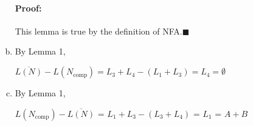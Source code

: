 \documentclass[11pt]{article}
\newcommand{\comp}[1]{#1_{\text{comp}}}
\begin{document}
\begin{solution}
\begin{enumerate}[(a)]
\paragraph{Proof:} This lemma is true by the definition of NFA.$\blacksquare$

\item
By Lemma 1,
\begin{center}
	$\overline{L(N)} - L(\comp{N}) = L_3 + L_4 - (L_1 + L_3) = L_4 = \emptyset$
\end{center}

\item  
By Lemma 1,
\begin{center}
	$L(\comp{N}) - \overline{L(N)}$ = $L_1 + L_3 -(L_3 + L_4)$ = $L_1$ = $A + B$
\end{center}

\end{enumerate}
\end{solution}
\end{document}
